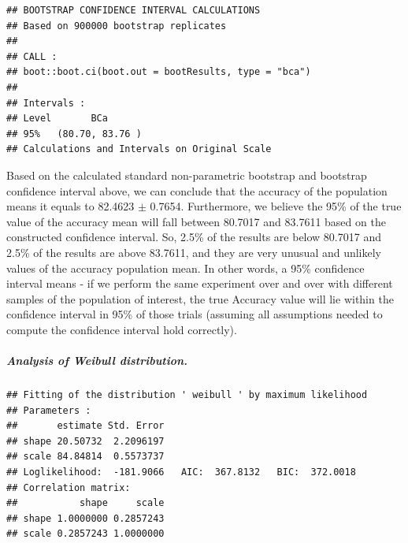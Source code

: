 \documentclass[
]{article}
\newenvironment{Shaded}{\begin{snugshade}}{\end{snugshade}}
\newcommand{\FunctionTok}[1]{\textcolor[rgb]{0.00,0.00,0.00}{#1}}
\newcommand{\NormalTok}[1]{#1}
\newcommand{\OtherTok}[1]{\textcolor[rgb]{0.56,0.35,0.01}{#1}}
\newcommand{\SpecialCharTok}[1]{\textcolor[rgb]{0.00,0.00,0.00}{#1}}
\newcommand{\StringTok}[1]{\textcolor[rgb]{0.31,0.60,0.02}{#1}}
\begin{document}
\begin{verbatim}
## BOOTSTRAP CONFIDENCE INTERVAL CALCULATIONS
## Based on 900000 bootstrap replicates
## 
## CALL : 
## boot::boot.ci(boot.out = bootResults, type = "bca")
## 
## Intervals : 
## Level       BCa          
## 95%   (80.70, 83.76 )  
## Calculations and Intervals on Original Scale
\end{verbatim}

Based on the calculated standard non-parametric bootstrap and bootstrap confidence interval above, we can conclude that the accuracy of the population means it equals to 82.4623 \(\pm\) 0.7654. Furthermore, we believe the 95\% of the true value of the accuracy mean will fall between 80.7017 and 83.7611 based on the constructed confidence interval. So, 2.5\% of the results are below 80.7017 and 2.5\% of the results are above 83.7611, and they are very unusual and unlikely values of the accuracy population mean. In other words, a 95\% confidence interval means - if we perform the same experiment over and over with different samples of the population of interest, the true Accuracy value will lie within the confidence interval in 95\% of those trials (assuming all assumptions needed to compute the confidence interval hold correctly).

\hypertarget{analysis-of-weibull-distribution.}{%
\subparagraph{Analysis of Weibull distribution.}\label{analysis-of-weibull-distribution.}}

\begin{Shaded}
\end{Shaded}

\begin{verbatim}
## Fitting of the distribution ' weibull ' by maximum likelihood 
## Parameters : 
##       estimate Std. Error
## shape 20.50732  2.2096197
## scale 84.84814  0.5573737
## Loglikelihood:  -181.9066   AIC:  367.8132   BIC:  372.0018 
## Correlation matrix:
##           shape     scale
## shape 1.0000000 0.2857243
## scale 0.2857243 1.0000000
\end{verbatim}
\end{document}
